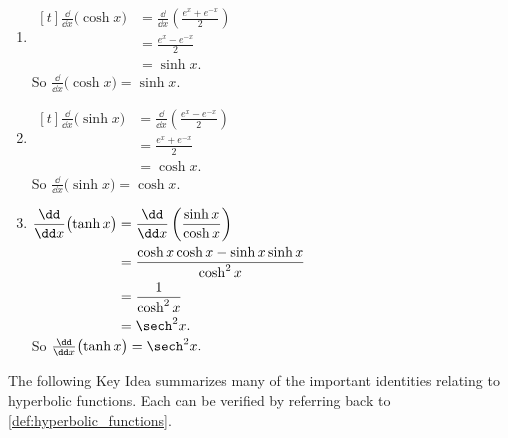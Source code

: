 \begin{example}
\begin{enumerate}
\item \hfill$\begin{aligned}[t]
	\frac{\dd}{\dd x}\bigl(\cosh x\bigr)
	&= \frac{\dd}{\dd x}\left(\frac{e^x+e^{-x}}2\right) \\
	&= \frac{e^x-e^{-x}}2\\
	&= \sinh x.
\end{aligned}$\hfill\null\\
So $\frac{\dd}{\dd x}\bigl(\cosh x\bigr) = \sinh x.$
	
\item \hfill$\begin{aligned}[t]
	\frac{\dd}{\dd x}\bigl(\sinh x\bigr)
	&= \frac{\dd}{\dd x}\left(\frac{e^x-e^{-x}}2\right) \\
	&= \frac{e^x+e^{-x}}2\\
	&= \cosh x.
\end{aligned}$\hfill\null\\
So $\frac{\dd}{\dd x}\bigl(\sinh x\bigr) = \cosh x.$

\item \hfill$\begin{aligned}[t]
	\frac{\dd}{\dd x}\bigl(\tanh x\bigr)
	&= \frac{\dd}{\dd x}\left(\frac{\sinh x}{\cosh x}\right) \\
	&= \frac{\cosh x \cosh x - \sinh x \sinh x}{\cosh^2 x}\\
	&= \frac{1}{\cosh^2 x}\\
	&= \sech^2 x.
\end{aligned}$\hfill\null\\
So $\frac{\dd}{\dd x}\bigl(\tanh x\bigr) = \sech^2 x.$
\end{enumerate}
\end{example}

The following Key Idea summarizes many of the important identities relating to hyperbolic functions. Each can be verified by referring back to \autoref{def:hyperbolic_functions}.

